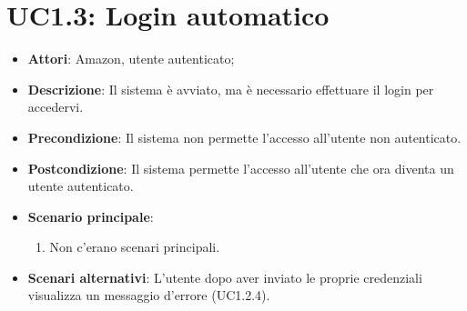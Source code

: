 \section{UC1.3: Login automatico}
\label{UC1.3}
\begin{itemize}
	\item \textbf{Attori}: Amazon, utente autenticato;
	\item \textbf{Descrizione}: Il sistema è avviato, ma è necessario effettuare il login per accedervi.
	\item \textbf{Precondizione}: Il sistema non permette l'accesso all'utente non autenticato.
	\item \textbf{Postcondizione}: Il sistema permette l'accesso all'utente che ora diventa un utente autenticato.
	\item \textbf{Scenario principale}:
	\begin{enumerate} \item Non c'erano scenari principali.\end{enumerate}
	\item \textbf{Scenari alternativi}:
	L'utente dopo aver inviato le proprie credenziali visualizza un messaggio d'errore (UC1.2.4).
\end{itemize}

